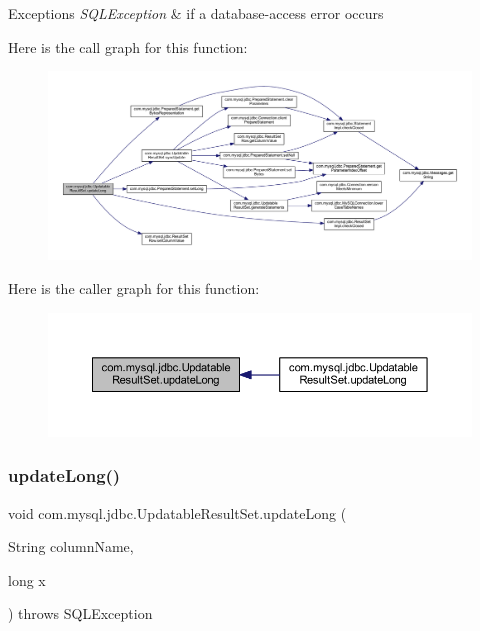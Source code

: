 \begin{DoxyExceptions}{Exceptions}
{\em S\+Q\+L\+Exception} & if a database-\/access error occurs \\
\hline
\end{DoxyExceptions}
Here is the call graph for this function\+:
\nopagebreak
\begin{figure}[H]
\begin{center}
\leavevmode
\includegraphics[width=350pt]{classcom_1_1mysql_1_1jdbc_1_1_updatable_result_set_a53f2a28ae9fde4bd075d46a0b94dab63_cgraph}
\end{center}
\end{figure}
Here is the caller graph for this function\+:
\nopagebreak
\begin{figure}[H]
\begin{center}
\leavevmode
\includegraphics[width=350pt]{classcom_1_1mysql_1_1jdbc_1_1_updatable_result_set_a53f2a28ae9fde4bd075d46a0b94dab63_icgraph}
\end{center}
\end{figure}
\mbox{\label{classcom_1_1mysql_1_1jdbc_1_1_updatable_result_set_a35881cdc339f9cc77868b0b89955a36a}} 
\subsubsection{\texorpdfstring{update\+Long()}{updateLong()}\hspace{0.1cm}{\footnotesize\ttfamily [2/2]}}
{\footnotesize\ttfamily void com.\+mysql.\+jdbc.\+Updatable\+Result\+Set.\+update\+Long (\begin{DoxyParamCaption}\item[{String}]{column\+Name,  }\item[{long}]{x }\end{DoxyParamCaption}) throws S\+Q\+L\+Exception}

